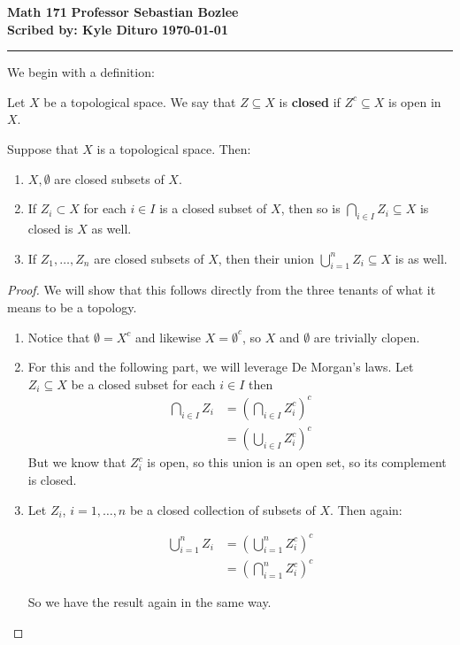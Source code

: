 \message{ !name(2.21.23.math.171.tex)}\documentclass[12pt, twosided]{article}
\begin{document}

\noindent \textbf{Math 171} \hfill \textbf{Professor Sebastian Bozlee} \\
\textbf{Scribed by: Kyle Dituro} \hfill \textbf{\today}\hrule
\vspace{.2in}

We begin with a definition:

\begin{df}
  Let \(X\) be a topological space. We say that \(Z \subseteq X\) is \textbf{closed} if \(Z^c \subseteq X\) is open in \(X\).
\end{df}

\begin{prop}
  Suppose that \(X\) is a topological space. Then:
  \begin{enumerate}
  \item \(X, \emptyset\) are closed subsets of \(X\).
  \item If \(Z_i \subset X\) for each \(i \in I\) is a closed subset of \(X\), then so is \(\bigcap_{i \in I}Z_i \subseteq X\) is closed is \(X\) as well.
  \item If \(Z_1, \ldots, Z_n\) are closed subsets of \(X\), then their union \(\bigcup_{i = 1}^nZ_i \subseteq X\) is as well.
  \end{enumerate}
\end{prop}
\begin{proof}
  We will show that this follows directly from the three tenants of what it means to be a topology.
  \begin{enumerate}
  \item Notice that \(\emptyset = X^c\) and likewise \(X = \emptyset^c\), so \(X\) and \(\emptyset\) are trivially clopen.
  \item For this and the following part, we will leverage De Morgan's laws. Let \(Z_i \subseteq X\) be a closed subset for each \(i \in I\) then
    \begin{align*}
      \bigcap_{i\in I}Z_i &= \left(\bigcap_{i \in I}Z_i^c\right)^c \\
                          &= \left(\bigcup_{i \in I} Z_{i}^c \right)^c
    \end{align*}
    But we know that \(Z_i^c\) is open, so this union is an open set, so its complement is closed.
  \item Let \(Z_i\), \(i = 1, \ldots, n\) be a closed collection of subsets of \(X\). Then again:

    \begin{align*}
      \bigcup_{i=1}^n Z_{i} &= \left(\bigcup_{i=1}^nZ_i^c\right)^c \\
                            &=\left(\bigcap_{i=1}^nZ_i^c \right)^c
    \end{align*}

    So we have the result again in the same way.
  \end{enumerate}
\end{proof}
\end{document}
